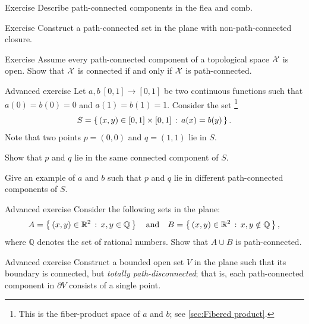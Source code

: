 \begin{thm}{Exercise}\label{ex:flea-and-comb}
Describe path-connected components in the flea and comb.
\end{thm}

\begin{thm}{Exercise}\label{ex:nonpathconnected-closure}
Construct a path-connected set in the plane with non-path-connected closure.
\end{thm}


\begin{thm}{Exercise}\label{ex:path-connected-component-closed-open}
Assume every path-connected component of a topological space $\mathcal{X}$ is open.
Show that $\mathcal{X}$ is connected if and only if $\mathcal{X}$ is path-connected.
\end{thm}

\begin{thm}{Advanced exercise}\label{ex:monks}
Let $a,b\:[0,1]\to [0,1]$ be two continuous functions such that $a(0)=b(0)=0$ and $a(1)=b(1)=1$.
Consider the set%
\footnote{This is the fiber-product space of $a$ and $b$; see \ref{sec:Fibered product}.}
\[S=\left\{\,{(x,y)\in[0,1]\times [0,1]}\,:\,{a(x)=b(y)}\,\right\}.\]
Note that two points $p=(0,0)$ and $q=(1,1)$ lie in $S$.

\begin{subthm}{}
Show that $p$ and $q$ lie in the same connected component of $S$.
\end{subthm}

\begin{subthm}{}
Give an example of $a$ and $b$ such that $p$ and $q$ lie in different path-connected components of $S$.
\end{subthm}

\end{thm}

\begin{thm}{Advanced exercise}\label{ex:QQ}
Consider the following sets in the plane:
\[A=\left\{\,{(x,y)\in\mathbb{R}^2}\,:\,{ x,y\in\mathbb{Q}}\,\right\}
\quad\text{and}\quad
B=\left\{\,{(x,y)\in\mathbb{R}^2}\,:\,{x,y\notin\mathbb{Q}}\,\right\},\]
where $\mathbb{Q}$ denotes the set of rational numbers.
Show that $A\cup B$ is path-connected.
\end{thm}

\begin{thm}{Advanced exercise}\label{ex:pseudocircle}
Construct a bounded open set $V$ in the plane such that its boundary is connected, but \emph{totally path-disconnected};
that is, each path-connected component in $\partial V$ consists of a single point.
\end{thm}

